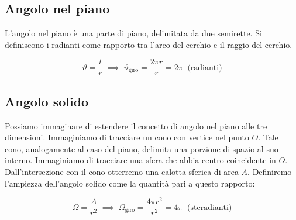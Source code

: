 \subsection{Angolo nel piano}
L'angolo nel piano è una parte di piano, delimitata da due semirette. Si definiscono i radianti come rapporto tra l'arco del cerchio e il raggio del cerchio.

\[
	\vartheta = \frac{l}{r} \; \implies \; \vartheta_{\text{giro}}  = \frac{2\pi r}{r} = 2\pi \;\; \text{(radianti)}
\]

\subsection{Angolo solido}
Possiamo immaginare di estendere il concetto di angolo nel piano alle tre dimensioni. Immaginiamo di tracciare un cono con vertice nel punto $O$. Tale cono, analogamente al caso del piano, delimita una porzione di spazio al suo interno. Immaginiamo di tracciare una sfera che abbia
centro coincidente in $O$. Dall'intersezione con il cono otterremo una calotta sferica di area $A$. Definiremo l'ampiezza dell'angolo solido come la quantità pari a questo rapporto:

\[
	\Omega = \frac{A}{r^2} \; \implies \; \Omega_{\text{giro}} = \frac{4\pi r^2}{r^2} =4\pi \;\; \text{(steradianti)}
\]

